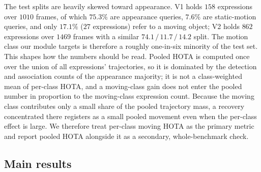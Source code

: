 \documentclass[sigconf,review,anonymous]{acmart}
\begin{document}
The test splits are heavily skewed toward appearance. V1 holds $158$ expressions over $1010$ frames, of which $75.3\%$ are appearance queries, $7.6\%$ are static-motion queries, and only $17.1\%$ ($27$ expressions) refer to a moving object; V2 holds $862$ expressions over $1469$ frames with a similar $74.1\,/\,11.7\,/\,14.2$ split. The motion class our module targets is therefore a roughly one-in-six minority of the test set. This shapes how the numbers should be read. Pooled HOTA is computed once over the union of all expressions' trajectories, so it is dominated by the detection and association counts of the appearance majority; it is not a class-weighted mean of per-class HOTA, and a moving-class gain does not enter the pooled number in proportion to the moving-class expression count. Because the moving class contributes only a small share of the pooled trajectory mass, a recovery concentrated there registers as a small pooled movement even when the per-class effect is large. We therefore treat per-class moving HOTA as the primary metric and report pooled HOTA alongside it as a secondary, whole-benchmark check.

\subsection{Main results}
\label{sec:main}
\end{document}
